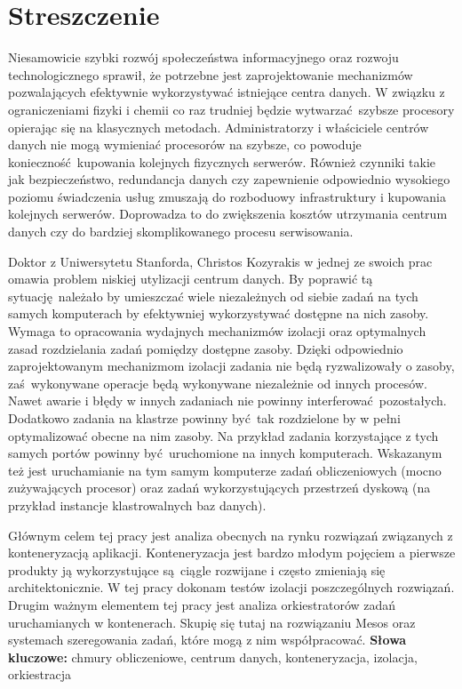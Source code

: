 \documentclass[10pt,a4paper,titlepage,twoside]{report}
\begin{document}
%


\setlength{\parindent}{1.25cm}


\setcounter{page}{3}
\onehalfspacing
\justify
\section*{Streszczenie}
\indent\indent Niesamowicie szybki rozwój społeczeństwa informacyjnego oraz rozwoju technologicznego sprawił, że potrzebne jest zaprojektowanie mechanizmów pozwalających efektywnie wykorzystywać istniejące centra danych. W związku z ograniczeniami fizyki i chemii co raz trudniej będzie wytwarzać szybsze procesory opierając się na klasycznych metodach. Administratorzy i właściciele centrów danych nie mogą wymieniać procesorów na szybsze, co powoduje konieczność kupowania kolejnych fizycznych serwerów. Również czynniki takie jak bezpieczeństwo, redundancja danych czy zapewnienie odpowiednio wysokiego poziomu świadczenia usług zmuszają do rozboduowy infrastruktury i kupowania kolejnych serwerów. Doprowadza to do zwiększenia kosztów utrzymania centrum danych czy do bardziej skomplikowanego procesu serwisowania.

Doktor z Uniwersytetu Stanforda, Christos Kozyrakis w jednej ze swoich prac omawia problem niskiej utylizacji centrum danych. By poprawić tą sytuację należało by umieszczać wiele niezależnych od siebie zadań na tych samych komputerach by efektywniej wykorzystywać dostępne na nich zasoby. Wymaga to opracowania wydajnych mechanizmów izolacji oraz optymalnych zasad rozdzielania zadań pomiędzy dostępne zasoby. Dzięki odpowiednio zaprojektowanym mechanizmom izolacji zadania nie będą ryzwalizowały o zasoby, zaś wykonywane operacje będą wykonywane niezależnie od innych procesów. Nawet awarie i błędy w innych zadaniach nie powinny interferować pozostałych. Dodatkowo zadania na klastrze powinny być tak rozdzielone by w pełni optymalizować obecne na nim zasoby. Na przykład zadania korzystające z tych samych portów powinny być uruchomione na innych komputerach. Wskazanym też jest uruchamianie na tym samym komputerze zadań obliczeniowych (mocno zużywających procesor) oraz zadań wykorzystujących przestrzeń dyskową (na przykład instancje klastrowalnych baz danych).

Głównym celem tej pracy jest analiza obecnych na rynku rozwiązań związanych z konteneryzacją aplikacji. Konteneryzacja jest bardzo młodym pojęciem a pierwsze produkty ją wykorzystujące są ciągle rozwijane i często zmieniają się architektonicznie. W tej pracy dokonam testów izolacji poszczególnych rozwiązań. Drugim ważnym elementem tej pracy jest analiza orkiestratorów zadań uruchamianych w kontenerach. Skupię się tutaj na rozwiązaniu Mesos oraz systemach szeregowania zadań, które mogą z nim współpracować. 
\newline
\newline
\newline
\noindent \textbf{Słowa kluczowe:} chmury obliczeniowe, centrum danych, konteneryzacja, izolacja, orkiestracja
\end{document}
